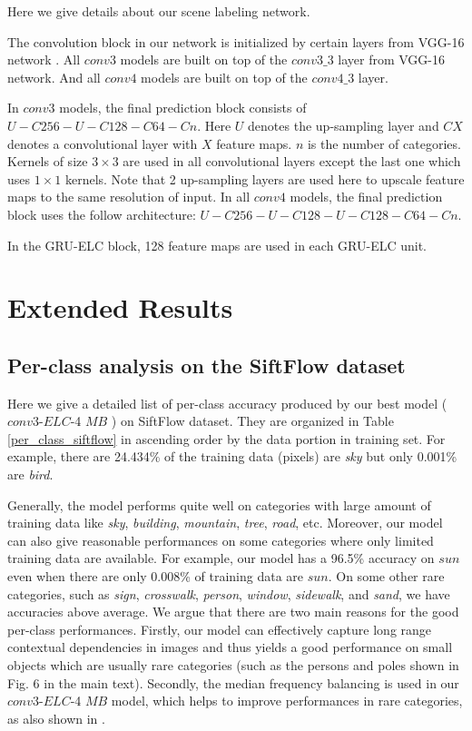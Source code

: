 \documentclass[10pt,twocolumn,letterpaper]{article}
\begin{document}
Here we give details about our scene labeling network. 

The convolution block in our network is initialized by certain layers from VGG-16 network \cite{vgg}. All $conv3$ models are built on top of the $conv3\_3$ layer from VGG-16 network. And all $conv4$ models are built on top of the $conv4\_3$ layer. 

In $conv3$ models, the final prediction block consists of $U-C256-U-C128-C64-Cn$. Here $U$ denotes the up-sampling layer and $CX$ denotes a convolutional layer with $X$ feature maps. $n$ is the number of categories. Kernels of size $3 \times 3$ are used in all convolutional layers except the last one which uses $1\times1$ kernels. Note that 2 up-sampling layers are used here to upscale feature maps to the same resolution of input. In all $conv4$ models, the final prediction block uses the follow architecture: $U-C256-U-C128-U-C128-C64-Cn$.

In the GRU-ELC block, 128 feature maps are used  in each GRU-ELC unit.


\section{Extended Results}
\subsection{Per-class analysis on the SiftFlow dataset}
Here we give a detailed list of per-class accuracy produced by our best model ($conv3$-$ELC$-4 $MB$ ) on SiftFlow dataset. They are organized in Table \ref{per_class_siftflow} in ascending order by the data portion in training set. For example, there are 24.434\% of the training data (pixels) are \textit{sky} but only 0.001\% are \textit{bird}.

Generally, the model performs quite well on categories with large amount of training data like \textit{sky}, \textit{building}, \textit{mountain}, \textit{tree}, \textit{road}, etc. Moreover, our model can also give reasonable performances on some categories where only limited training data are available. For example, our model has a 96.5\% accuracy on $sun$ even when there are only 0.008\% of training data are $sun$. On some other rare categories, such as \textit{sign}, \textit{crosswalk}, \textit{person}, \textit{window}, \textit{sidewalk}, and \textit{sand}, we have accuracies above average. We argue that there are two main reasons for the good per-class performances. Firstly, our model can effectively capture long range contextual dependencies in images and thus yields a good performance on small objects which are usually rare categories  (such as the persons and poles shown in Fig. 6 in the main text). Secondly, the median frequency balancing is used in our $conv3$-$ELC$-4 $MB$ model, which helps to improve performances in rare categories, as also shown in \cite{5, 2, 1, 36}.
\end{document}
